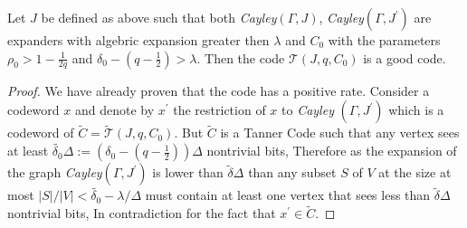   \begin{lemma} Let $J$ be defined as above such that both \emph{Cayley}$\left( \Gamma, J \right)$, \emph{Cayley}$\left( \Gamma, J^{\prime} \right)$ are expanders with algebric expansion greater then $\lambda$ and $C_0$ with the parameters $\rho_{0} > 1 - \frac{1}{2q}$ and $ \delta_{0} - \left( q - \frac{1}{2} \right) > \lambda$. Then the code $\mathcal{T}\left(J, q ,C_{0}\right)$ is a good code.\end{lemma}
  \begin{proof} We have already proven that the code has a positive rate. Consider a codeword $x$ and denote by $x^{\prime}$ the restriction of $x$ to \emph{Cayley }$\left( \Gamma, J^{\prime}  \right)$ which is a codeword of $\tilde{C} = \tilde{\mathcal{T}}\left(J, q ,C_{0}\right)$. But $\tilde{C}$ is a Tanner Code such that any vertex sees at least $ \tilde{\delta_{0}} \Delta := \left(\delta_{0} - \left( q - \frac{1}{2}   \right) \right)\Delta $ nontrivial bits, Therefore as the expansion of the graph \emph{Cayley}$\left( \Gamma, J^{\prime} \right)$ is lower than $\tilde{\delta}\Delta$ than any subset $S$ of $V$ at the size at most $|S|/|V| < \tilde{\delta_{0}} - \lambda / \Delta $  must contain at least one vertex that sees less than  $\tilde{\delta}\Delta$ nontrivial bits, In contradiction for the fact that $x^{\prime} \in \tilde{C}$. \end{proof} 


